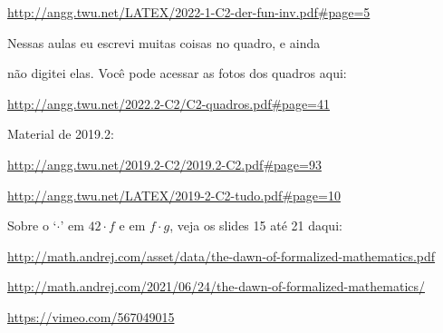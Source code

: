 \documentclass[oneside,12pt]{article}
\begin{document}
{{{%
\url{http://angg.twu.net/LATEX/2022-1-C2-der-fun-inv.pdf\#page=5}

}

\msk

Nessas aulas eu escrevi muitas coisas no quadro, e ainda

não digitei elas. Você pode acessar as fotos dos quadros aqui:


{\scriptsize

\url{http://angg.twu.net/2022.2-C2/C2-quadros.pdf\#page=41}

}

\msk

Material de 2019.2:

{\scriptsize

\url{http://angg.twu.net/2019.2-C2/2019.2-C2.pdf\#page=93}

\url{http://angg.twu.net/LATEX/2019-2-C2-tudo.pdf\#page=10}

}

\msk

Sobre o `$·$' em $42·f$ e em $f·g$, veja os slides 15 até 21 daqui:

{\scriptsize

\url{http://math.andrej.com/asset/data/the-dawn-of-formalized-mathematics.pdf}

\url{http://math.andrej.com/2021/06/24/the-dawn-of-formalized-mathematics/}

\url{https://vimeo.com/567049015}

}

}}
\end{document}
